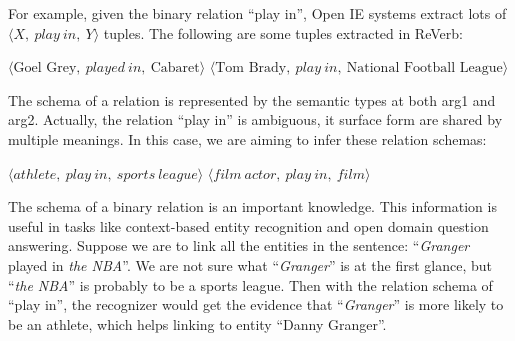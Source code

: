 
For example, given the binary relation ``play in'', Open IE systems extract lots of
$\langle X,\ play\ in,\ Y \rangle$ tuples. The following are some tuples extracted in ReVerb:

\begin{center}
$\langle \text{Goel Grey},\ played\ in,\ \text{Cabaret} \rangle$
$\langle \text{Tom Brady},\ play\ in,\ \text{National Football League} \rangle$
\end{center}

The schema of a relation is represented by the semantic types at both arg1 and arg2.
Actually, the relation ``play in'' is ambiguous, it surface form are shared by multiple meanings.
In this case, we are aiming to infer these relation schemas:

\begin{center}
$\langle athlete,\ play\ in,\ sports\ league \rangle$
$\langle film\ actor,\ play\ in,\ film \rangle$
\end{center}

%
%
%

The schema of a binary relation is an important knowledge. This information is useful in tasks like context-based entity recognition and open domain question answering.
Suppose we are to link all the entities in the sentence: ``\textit{Granger} played in \textit{the NBA}''. We are not sure what ``\textit{Granger}'' is at the first glance, but ``\textit{the NBA}'' is probably to be a sports league. Then with the relation schema of ``play in'',
the recognizer would get the evidence that ``\textit{Granger}'' is more likely to be an athlete, which helps linking to entity ``Danny Granger''.

